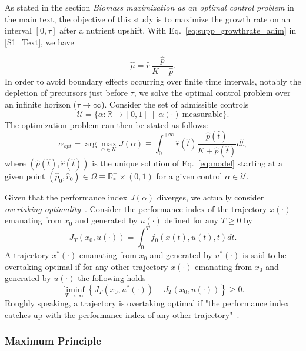 As stated in the section \textit{Biomass maximization as an optimal control problem} in the main text, the objective of this study is to maximize the growth rate on an interval $[0,\tau]$ after a nutrient upshift. With Eq.~\ref{eq:supp_growthrate_adim} in \ref{S1_Text}, we have
 
\begin{equation*}
\hat{\mu}= \hat{r}\, \dfrac{\hat{p}}{K+\hat{p}}.
\end{equation*}
In order to avoid boundary effects occurring over finite time intervals, notably the depletion of precursors just before $\tau$, we solve the optimal control problem over an infinite horizon ($\tau \rightarrow \infty$). Consider the set of admissible controls
\[
\mathcal{U}=\{\alpha:\mathbb{R} \rightarrow [0,1] \ \mid \ \alpha(\cdot) \ \mathrm{measurable}\}.
\]
The optimization problem can then be stated as follows:
\begin{equation}\label{Prob}
\alpha_{opt} = \arg \max_{\alpha \in \mathcal{U}} J(\alpha)\equiv \int_0^{+\infty} \hat{r}(\hat{t}) \frac{\hat{p}(\hat{t})}{K + \hat{p}(\hat{t})} d\hat{t} ,
\end{equation}
where $(\hat{p}(\hat{t}),\hat{r}(\hat{t}))$ is the unique solution of Eq.~\ref{eq:model} starting at a given point $(\hat{p}_0,\hat{r}_0)\in \Omega \equiv \mathbb{R}^+_* \times (0,1)$ for a given control $\alpha\in \mathcal{U}$.

Given that the performance index $J(\alpha)$ diverges, we actually consider \textit{overtaking optimality}~\cite{carlson_infinite_1991}.
Consider the performance index of the trajectory $x(\cdot)$ emanating from $x_0$ and generated by $u(\cdot)$ defined for any $T\geq 0$ by
$$
J_T(x_0,u(\cdot))=\int_0^T f_0(x(t),u(t),t)dt.
$$
A trajectory $x^*(\cdot)$ emanating from $x_0$ and generated by $u^*(\cdot)$ is said to be overtaking optimal if for any other trajectory $x(\cdot)$ emanating from $x_0$ and generated by $u(\cdot)$ the following holds
$$
\liminf_{T\rightarrow\infty} \left\lbrace J_T(x_0,u^*(\cdot)) - J_T(x_0,u(\cdot))\right\rbrace\geq 0.
$$
Roughly speaking, a trajectory is overtaking optimal if "the performance index catches up with the performance index of any other trajectory"~\cite{carlson_infinite_1991}.

\subsubsection{Maximum Principle}

